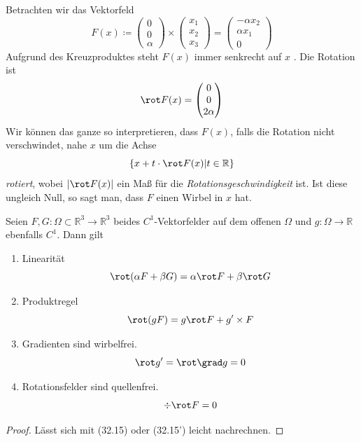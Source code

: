 \begin{beispiel}
Betrachten wir das Vektorfeld 
\begin{equation*}
	F(x)\coloneqq \begin{pmatrix}
	0 \\ 0 \\ \alpha \end{pmatrix} \times
	\begin{pmatrix}
	x_1 \\ x_2 \\ x_3 \end{pmatrix} = 
	\begin{pmatrix}
	-\alpha x_2 \\ \alpha x_1 \\ 0 \end{pmatrix} 
\end{equation*}
Aufgrund des Kreuzproduktes steht $F(x)$ immer senkrecht auf $x$ . Die Rotation ist
\begin{equation*}
	\rot F(x) = \begin{pmatrix}
	0 \\ 0 \\ 2\alpha
	\end{pmatrix}
\end{equation*}
Wir können das ganze so interpretieren, dass $F(x)$, falls die Rotation nicht verschwindet, nahe $x$ um die Achse 
\begin{equation*}
	\left\{ x + t\cdot\rot F(x)\middle| 
	t\in\mathbb{R}\right\}
\end{equation*}
\emph{rotiert}, wobei $|\rot F(x)|$ ein Maß für die 
\emph{Rotationsgeschwindigkeit} ist. Ist diese ungleich Null, so sagt man, dass $F$ einen Wirbel in $x$ hat.
\end{beispiel}

\begin{satz}[Rechenregeln]
Seien $F,G:\Omega\subset\mathbb{R}^3\rightarrow\mathbb{R}^3$ 
beides $C^1$-Vektorfelder auf dem offenen $\Omega$ und 
$g:\Omega\rightarrow\mathbb{R}$ ebenfalls $C^1$. Dann gilt
\begin{enumerate}
	\item 	Linearität
			\begin{equation*}
				\rot (\alpha F + \beta G) = 
				\alpha\rot F + \beta\rot G
			\end{equation*}
	\item 	Produktregel
			\begin{equation*}
				\rot (gF)=g\rot F+g'\times F
			\end{equation*}
	\item 	Gradienten sind wirbelfrei.
			\begin{equation*}
				\rot g' = 
				\rot \grad g=0
			\end{equation*}
	\item 	Rotationsfelder sind quellenfrei.
			\begin{equation*}
				\div \rot  F = 0
			\end{equation*}
\end{enumerate}
\end{satz}
\begin{proof}
Lässt sich mit (32.15) oder (32.15') leicht nachrechnen.
\end{proof}